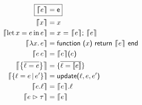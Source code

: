 \begin{align*}
\Aboxed{\denotl{e} &= \lua{e}} \\ 
\denotl{x} &= x \\ 
\denotl{\fllet{x}{e} e} &= x \lua{ = } \denotl{e} \lua{; } \denotl{e} \\
\denotl{\fllam{x} e} &= \lua{function (} x\lua{) return }\denotl{e}\lua{ end} \\ %
\denotl{e\,e} &= \denotl{e} \lua{(} e \lua{)} \\
\denotl{\flrec{\overline{\ell = e}}} &= \lua\{ \overline{\ell = \denot e} \lua\} \\
\denotl{\flext{\ell = e}{e'}} &= \lua{update(}\ell, e, e'\lua{)}  \\
\denotl{\flproj{e}{\ell}} &= \denotl{e}\lua{.}\ell \\
\denotl{\flcast{e}{\tau}} &= \denotl{e} \\
\centredalign
\end{align*}
\begin{minipage}{7.5cm}
\end{minipage}
